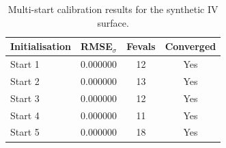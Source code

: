 \begin{table}[h!]
\centering
\begin{tabular}{lccc}
\hline
Initialisation & RMSE$_\sigma$ & Fevals & Converged \\
\hline
Start 1 & 0.000000 & 12 & Yes \\
Start 2 & 0.000000 & 13 & Yes \\
Start 3 & 0.000000 & 12 & Yes \\
Start 4 & 0.000000 & 11 & Yes \\
Start 5 & 0.000000 & 18 & Yes \\
\hline
\end{tabular}
\caption{Multi-start calibration results for the synthetic IV surface.}
\label{tab:multistart}
\end{table}
